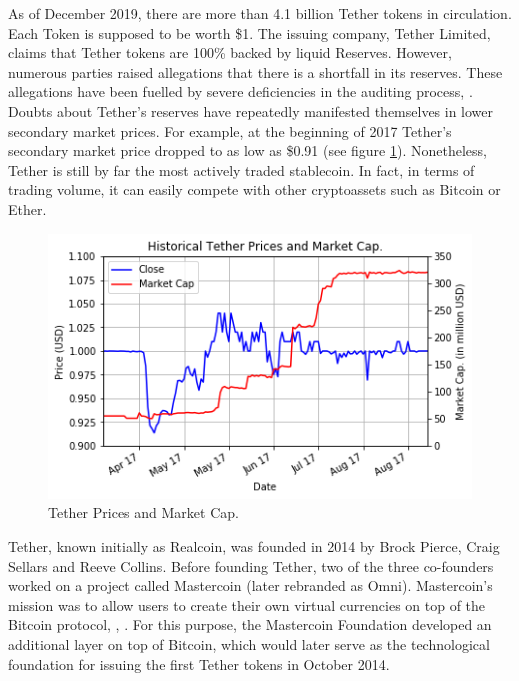 \documentclass[conference]{IEEEtran}
\begin{document}
As of December 2019, there are more than 4.1 billion Tether tokens in circulation. Each Token is supposed to be worth \$1. The issuing company, Tether Limited, claims that Tether tokens are 100\% backed by liquid Reserves. However, numerous parties raised allegations that there is a shortfall in its reserves. These allegations have been fuelled by severe deficiencies in
the auditing process, \cite{Tether}\cite{Forbes}. Doubts about Tether's reserves have repeatedly manifested themselves in lower secondary market prices. For example, at the beginning of 2017 Tether's secondary market price dropped to as low as \$0.91 (see figure \ref{fig:tether}). Nonetheless, Tether is still by far the most actively traded stablecoin. In fact, in terms of trading volume, it can easily compete with other cryptoassets such as Bitcoin or Ether.\cite{Coinmarketcap}\\ 

\begin{figure}[htbp]
	\centerline{
		\includegraphics[width=\linewidth]{assets/tetherPrices.png}
		}
	\caption{Tether Prices and Market Cap.}
	\label{fig:tether}
\end{figure}

Tether, known initially as Realcoin, was founded in 2014 by Brock Pierce, Craig Sellars and Reeve Collins. Before founding Tether, two of the three co-founders worked on a project called Mastercoin (later rebranded as Omni). Mastercoin's mission was to allow users to create their own virtual currencies on top of the Bitcoin protocol, \cite{Zynis}\cite{Sellars}, \cite{Roth}. For this purpose, the Mastercoin Foundation developed an additional layer on top of Bitcoin, which would later serve as the technological foundation for issuing the first Tether tokens in October 2014.\\
\end{document}
